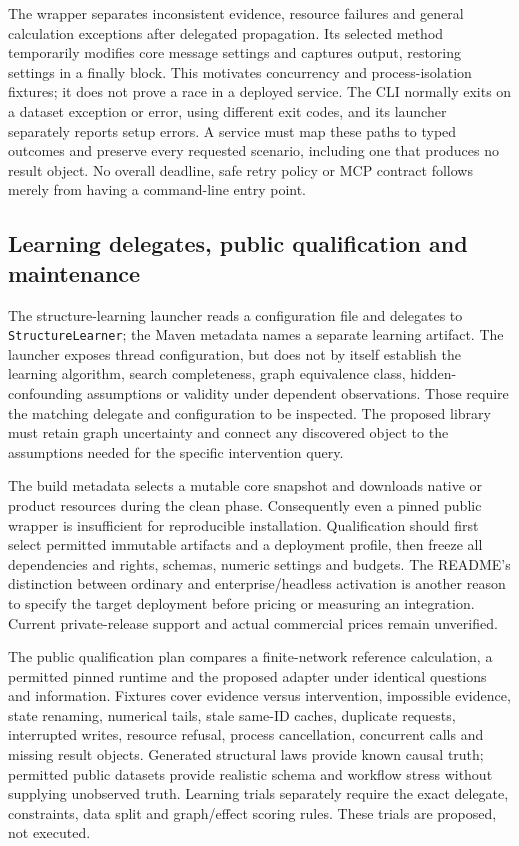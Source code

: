 The wrapper separates inconsistent evidence, resource failures and general
calculation exceptions after delegated propagation. Its selected method
temporarily modifies core message settings and captures output, restoring
settings in a finally block. This motivates concurrency and process-isolation
fixtures; it does not prove a race in a deployed service. The CLI normally
exits on a dataset exception or error, using different exit codes, and its
launcher separately reports setup errors. A service must map these paths to
typed outcomes and preserve every requested scenario, including one that
produces no result object. No overall deadline, safe retry policy or MCP
contract follows merely from having a command-line entry point.
\citep{exec25_agena_source,exec25_agena_choice}

\subsection{Learning delegates, public qualification and maintenance}
The structure-learning launcher reads a configuration file and delegates to
\texttt{StructureLearner}; the Maven metadata names a separate learning
artifact. The launcher exposes thread configuration, but does not by itself
establish the learning algorithm, search completeness, graph equivalence
class, hidden-confounding assumptions or validity under dependent observations.
Those require the matching delegate and configuration to be inspected. The
proposed library must retain graph uncertainty and connect any discovered
object to the assumptions needed for the specific intervention query.
\citep{exec25_agena_source,exec25_agena_choice}

The build metadata selects a mutable core snapshot and downloads native or
product resources during the clean phase. Consequently even a pinned public
wrapper is insufficient for reproducible installation. Qualification should
first select permitted immutable artifacts and a deployment profile, then
freeze all dependencies and rights, schemas, numeric settings and budgets.
The README's distinction between ordinary and enterprise/headless activation
is another reason to specify the target deployment before pricing or measuring
an integration. Current private-release support and actual commercial prices
remain unverified.~\citep{exec25_agena_source}

The public qualification plan compares a finite-network reference calculation,
a permitted pinned runtime and the proposed adapter under identical questions
and information. Fixtures cover evidence versus intervention, impossible
evidence, state renaming, numerical tails, stale same-ID caches, duplicate
requests, interrupted writes, resource refusal, process cancellation, concurrent
calls and missing result objects. Generated structural laws provide known
causal truth; permitted public datasets provide realistic schema and workflow
stress without supplying unobserved truth. Learning trials separately require
the exact delegate, constraints, data split and graph/effect scoring rules.
These trials are proposed, not executed.~\citep{exec25_agena_choice}

